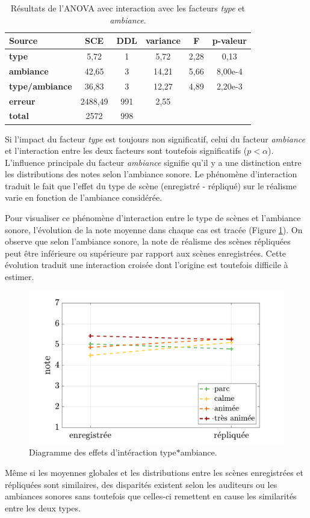 \begin{table}[ht]
\caption{Résultats de l'ANOVA avec interaction avec les facteurs \textit{type} et \textit{ambiance}.}
\centering
\begin{tabular}{lccccc}
\hline
\textbf{Source}     & \textbf{SCE} & \textbf{DDL} & \textbf{variance} & \textbf{F} & \textbf{p-valeur} \\
\hline
\textbf{type} & 5,72 & 1 & 5,72 & 2,28 & 0,13 \\
\hline
\textbf{ambiance} & 42,65 & 3 & 14,21 & 5,66 & 8,00e-4 \\
\hline
\textbf{type/ambiance} & 36,83 & 3 & 12,27 & 4,89 & 2,20e-3 \\
\hline
\textbf{erreur}      & 2488,49 & 991 & 2,55 & &  \\
\hline
\textbf{total}      & 2572 & 998 & & & \\
\hline
\end{tabular}
\label{tab:anova_ambiance}
\end{table}


Si l'impact du facteur \textit{type} est toujours non significatif, celui du facteur \textit{ambiance} et l'interaction entre les deux facteurs sont toutefois significatifs ($p < \alpha$). L'influence principale du facteur \textit{ambiance} signifie qu'il y a une distinction entre les distributions des notes selon l'ambiance sonore. Le phénomène d'interaction traduit le fait que l'effet du type de scène (enregistré - répliqué) sur le réalisme varie en fonction de l'ambiance considérée.

Pour visualiser ce phénomène d'interaction entre le type de scènes et l'ambiance sonore, l'évolution de la note moyenne dans chaque cas est tracée (Figure \ref{fig:interaction_ambianceType}). On observe que selon l'ambiance sonore, la note de réalisme des scènes répliquées peut être inférieure ou supérieure par rapport aux scènes enregistrées. Cette évolution traduit une interaction croisée dont l'origine est toutefois difficile à estimer. 

\begin{figure}[h]
\centering
\includegraphics[width=0.8\linewidth]{./figures/test_perceptif/testPerceptif_interactionAmbiance.pdf}
\caption{Diagramme des effets d'intéraction type$*$ambiance.}\label{fig:interaction_ambianceType}
\end{figure}


Même si les moyennes globales et les distributions entre les scènes enregistrées et répliquées sont similaires, des disparités existent selon les auditeurs ou les ambiances sonores sans toutefois que celles-ci remettent en cause les similarités entre les deux types.\\